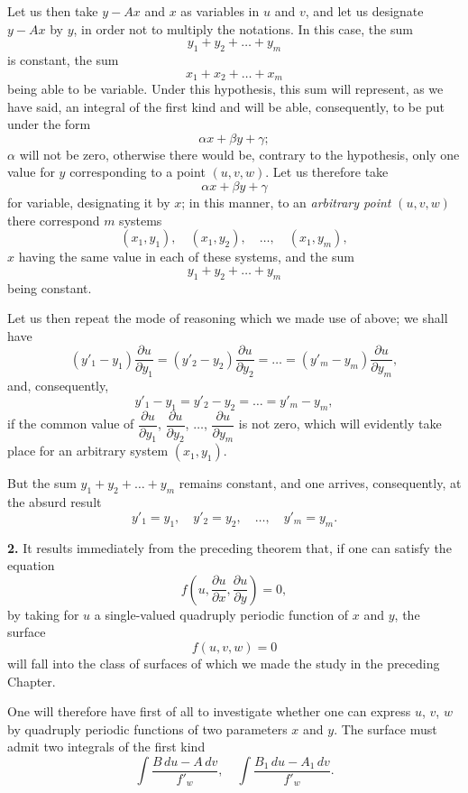 \documentclass{article}
\begin{document}
Let us then take $y - Ax$ and $x$ as variables in $u$ and $v$, and let us designate $y - Ax$ by $y$, in order not to multiply the notations. In this case, the sum
\[
y_{1} + y_{2} + \ldots + y_{m}
\]
is constant, the sum
\[
x_{1} + x_{2} + \ldots + x_{m}
\]
being able to be variable. Under this hypothesis, this sum will represent, as we have said, an integral of the first kind and will be able, consequently, to be put under the form
\[
\alpha x + \beta y + \gamma;
\]
$\alpha$ will not be zero, otherwise there would be, contrary to the hypothesis, only one value for $y$ corresponding to a point $(u, v, w)$. Let us therefore take
\[
\alpha x + \beta y + \gamma
\]
for variable, designating it by $x$; in this manner, to an \emph{arbitrary point} $(u, v, w)$ there correspond $m$ systems
\[
(x_{1}, y_{1}), \quad (x_{1}, y_{2}), \quad \ldots, \quad (x_{1}, y_{m}),
\]
$x$ having the same value in each of these systems, and the sum
\[
y_{1} + y_{2} + \ldots + y_{m}
\]
being constant.

Let us then repeat the mode of reasoning which we made use of above; we shall have
\[
(y'_{1} - y_{1})\frac{\partial u}{\partial y_{1}} = (y'_{2} - y_{2})\frac{\partial u}{\partial y_{2}} = \ldots = (y'_{m} - y_{m})\frac{\partial u}{\partial y_{m}},
\]
and, consequently,
\[
y'_{1} - y_{1} = y'_{2} - y_{2} = \ldots = y'_{m} - y_{m},
\]
if the common value of $\dfrac{\partial u}{\partial y_{1}}$, $\dfrac{\partial u}{\partial y_{2}}$, $\ldots$, $\dfrac{\partial u}{\partial y_{m}}$ is not zero, which will evidently take place for an arbitrary system $(x_{1}, y_{1})$.

But the sum $y_{1} + y_{2} + \ldots + y_{m}$ remains constant, and one arrives, consequently, at the absurd result
\[
y'_{1} = y_{1}, \quad y'_{2} = y_{2}, \quad \ldots, \quad y'_{m} = y_{m}.
\]


\textbf{2.} It results immediately from the preceding theorem that, if one can satisfy the equation
\[
f\left( u, \frac{\partial u}{\partial x}, \frac{\partial u}{\partial y} \right) = 0,
\]
by taking for $u$ a single-valued quadruply periodic function of $x$ and $y$, the surface
\[
f(u, v, w) = 0
\]
will fall into the class of surfaces of which we made the study in the preceding Chapter.

One will therefore have first of all to investigate whether one can express $u$, $v$, $w$ by quadruply periodic functions of two parameters $x$ and $y$. The surface must admit two integrals of the first kind
\[
\int \frac{B\,du - A\,dv}{f'_{w}}, \quad \int \frac{B_{1}\,du - A_{1}\,dv}{f'_{w}}.
\]
\end{document}
